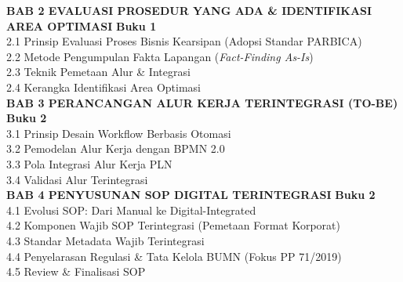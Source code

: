 \documentclass[12pt,a4paper]{report}
\begin{document}
{\large\bfseries BAB 2 \quad EVALUASI PROSEDUR YANG ADA \& IDENTIFIKASI AREA OPTIMASI} \dotfill \textbf{Buku 1} \\
\hspace*{1.5cm} 2.1 Prinsip Evaluasi Proses Bisnis Kearsipan (Adopsi Standar PARBICA) \dotfill \\
\hspace*{1.5cm} 2.2 Metode Pengumpulan Fakta Lapangan (\textit{Fact-Finding As-Is}) \dotfill \\
\hspace*{1.5cm} 2.3 Teknik Pemetaan Alur \& Integrasi \dotfill \\
\hspace*{1.5cm} 2.4 Kerangka Identifikasi Area Optimasi \dotfill \\[0.2cm]

{\large\bfseries BAB 3 \quad PERANCANGAN ALUR KERJA TERINTEGRASI (TO-BE)} \dotfill \textbf{Buku 2} \\
\hspace*{1.5cm} 3.1 Prinsip Desain Workflow Berbasis Otomasi \dotfill \\
\hspace*{1.5cm} 3.2 Pemodelan Alur Kerja dengan BPMN 2.0 \dotfill \\
\hspace*{1.5cm} 3.3 Pola Integrasi Alur Kerja PLN \dotfill \\
\hspace*{1.5cm} 3.4 Validasi Alur Terintegrasi \dotfill \\[0.2cm]

{\large\bfseries BAB 4 \quad PENYUSUNAN SOP DIGITAL TERINTEGRASI} \dotfill \textbf{Buku 2} \\
\hspace*{1.5cm} 4.1 Evolusi SOP: Dari Manual ke Digital-Integrated \dotfill \\
\hspace*{1.5cm} 4.2 Komponen Wajib SOP Terintegrasi (Pemetaan Format Korporat) \dotfill \\
\hspace*{1.5cm} 4.3 Standar Metadata Wajib Terintegrasi \dotfill \\
\hspace*{1.5cm} 4.4 Penyelarasan Regulasi \& Tata Kelola BUMN (Fokus PP 71/2019) \dotfill \\
\hspace*{1.5cm} 4.5 Review \& Finalisasi SOP \dotfill \\[0.2cm]
\end{document}
